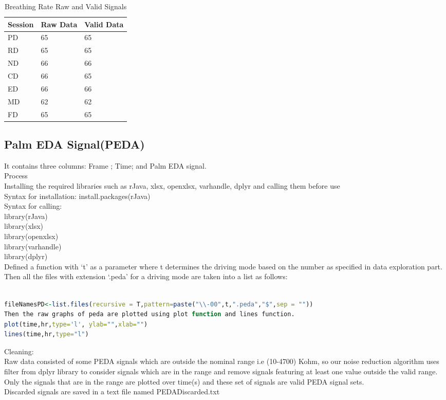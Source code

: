 \documentclass[a4paper]{article}
\begin{document}
 \begin{table}[!h]
 \centering
 \begin{tabular}{l|l|l}
Session & Raw Data & Valid Data \\\hline
 PD & 65 & 65\\
RD & 65 & 65 \\
ND & 66 & 66 \\
CD & 66 & 65 \\
ED & 66 & 66 \\
MD & 62 & 62 \\
FD & 65 & 65 
 \end{tabular}
\caption{\label{tab:br}Breathing Rate Raw and Valid Signals}
\end{table}

\FloatBarrier

\subsection{Palm EDA Signal(PEDA)}

It contains three columns: Frame ; Time; and Palm EDA signal.  \\
Process\\
Installing the required libraries such as rJava, xlsx, openxlsx, varhandle, dplyr and calling them before use\\
Syntax for installation: install.packages(rJava)\\
Syntax for calling: \\
library(rJava)\\
library(xlsx)\\
library(openxlsx)\\
library(varhandle)\\
library(dplyr)\\
Defined a function with ‘t’ as a parameter where t determines the driving mode based on the number as specified in data exploration part.\\
Then all the files with extension ‘.peda’ for a driving mode are taken into a list as follows:
\begin{lstlisting}[language=R]

fileNamesPD<-list.files(recursive = T,pattern=paste("\\-00",t,".peda","$",sep = ""))
Then the raw graphs of peda are plotted using plot function and lines function.
plot(time,hr,type='l', ylab="",xlab="")
lines(time,hr,type="l")
\end{lstlisting}
Cleaning:\\
Raw data consisted of some PEDA signals which are outside the nominal range i.e (10-4700) Kohm, so our noise reduction algorithm uses filter from dplyr library to consider signals which are in the range and remove signals featuring at least one value outside the valid range. Only the signals that are in the range are plotted over time(s) and these set of signals are valid PEDA signal sets.\\
Discarded signals are saved in a text file named PEDADiscarded.txt\\
\end{document}
